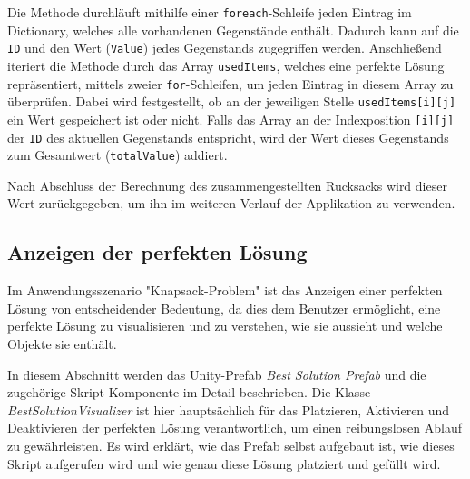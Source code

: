 \begin{itemize}
Die Methode durchläuft mithilfe einer \texttt{foreach}-Schleife jeden Eintrag im Dictionary, welches alle vorhandenen
Gegenstände enthält. Dadurch kann auf die \texttt{ID} und den Wert (\texttt{Value}) jedes Gegenstands zugegriffen werden.
Anschließend iteriert die Methode durch das Array \texttt{usedItems}, welches eine perfekte Lösung repräsentiert, mittels
zweier \texttt{for}-Schleifen, um jeden Eintrag in diesem Array zu überprüfen. Dabei wird festgestellt, ob an der jeweiligen
Stelle \texttt{usedItems[i][j]} ein Wert gespeichert ist oder nicht. Falls das Array an der Indexposition \texttt{[i][j]}
der \texttt{ID} des aktuellen Gegenstands entspricht, wird der Wert dieses Gegenstands zum Gesamtwert (\texttt{totalValue})
addiert.

Nach Abschluss der Berechnung des zusammengestellten Rucksacks wird dieser Wert zurückgegeben, um ihn im weiteren Verlauf
der Applikation zu verwenden.

\subsection{Anzeigen der perfekten Lösung}
Im Anwendungsszenario "Knapsack-Problem" ist das Anzeigen einer perfekten Lösung von entscheidender Bedeutung, da dies dem
Benutzer ermöglicht, eine perfekte Lösung zu visualisieren und zu verstehen, wie sie aussieht und welche Objekte sie enthält.

In diesem Abschnitt werden das Unity-Prefab \textit{Best Solution Prefab} und die zugehörige Skript-Komponente im Detail
beschrieben. Die Klasse \textit{BestSolutionVisualizer} ist hier hauptsächlich für das Platzieren, Aktivieren und Deaktivieren
der perfekten Lösung verantwortlich, um einen reibungslosen Ablauf zu gewährleisten. Es wird erklärt, wie das Prefab
selbst aufgebaut ist, wie dieses Skript aufgerufen wird und wie genau diese Lösung platziert und gefüllt wird.


\end{itemize}
